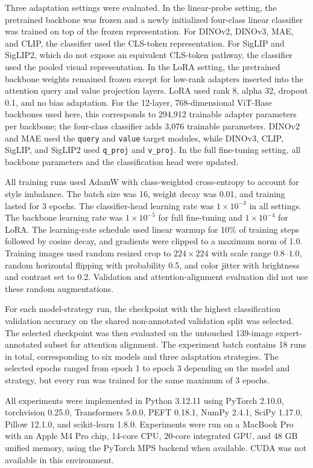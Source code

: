 \documentclass[lineno,pdflatex,sn-mathphys-num]{sn-jnl}%
\theoremstyle{thmstyleone}%
\theoremstyle{thmstyletwo}%
\theoremstyle{thmstylethree}%
\begin{document}
Three adaptation settings were evaluated. In the linear-probe setting, the pretrained backbone was frozen and a newly initialized four-class linear classifier was trained on top of the frozen representation. For DINOv2, DINOv3, MAE, and CLIP, the classifier used the CLS-token representation. For SigLIP and SigLIP2, which do not expose an equivalent CLS-token pathway, the classifier used the pooled visual representation. In the LoRA setting, the pretrained backbone weights remained frozen except for low-rank adapters inserted into the attention query and value projection layers. LoRA used rank 8, alpha 32, dropout 0.1, and no bias adaptation. For the 12-layer, 768-dimensional ViT-Base backbones used here, this corresponds to 294,912 trainable adapter parameters per backbone; the four-class classifier adds 3,076 trainable parameters. DINOv2 and MAE used the \texttt{query} and \texttt{value} target modules, while DINOv3, CLIP, SigLIP, and SigLIP2 used \texttt{q\_proj} and \texttt{v\_proj}. In the full fine-tuning setting, all backbone parameters and the classification head were updated.

All training runs used AdamW with class-weighted cross-entropy to account for style imbalance. The batch size was 16, weight decay was 0.01, and training lasted for 3 epochs. The classifier-head learning rate was $1 \times 10^{-3}$ in all settings. The backbone learning rate was $1 \times 10^{-5}$ for full fine-tuning and $1 \times 10^{-4}$ for LoRA. The learning-rate schedule used linear warmup for 10\% of training steps followed by cosine decay, and gradients were clipped to a maximum norm of 1.0. Training images used random resized crop to $224 \times 224$ with scale range $0.8$--$1.0$, random horizontal flipping with probability 0.5, and color jitter with brightness and contrast set to 0.2. Validation and attention-alignment evaluation did not use these random augmentations.

For each model-strategy run, the checkpoint with the highest classification validation accuracy on the shared non-annotated validation split was selected. The selected checkpoint was then evaluated on the untouched 139-image expert-annotated subset for attention alignment. The experiment batch contains 18 runs in total, corresponding to six models and three adaptation strategies. The selected epochs ranged from epoch 1 to epoch 3 depending on the model and strategy, but every run was trained for the same maximum of 3 epochs.

All experiments were implemented in Python 3.12.11 using PyTorch 2.10.0, torchvision 0.25.0, Transformers 5.0.0, PEFT 0.18.1, NumPy 2.4.1, SciPy 1.17.0, Pillow 12.1.0, and scikit-learn 1.8.0. Experiments were run on a MacBook Pro with an Apple M4 Pro chip, 14-core CPU, 20-core integrated GPU, and 48 GB unified memory, using the PyTorch MPS backend when available. CUDA was not available in this environment.
\end{document}
